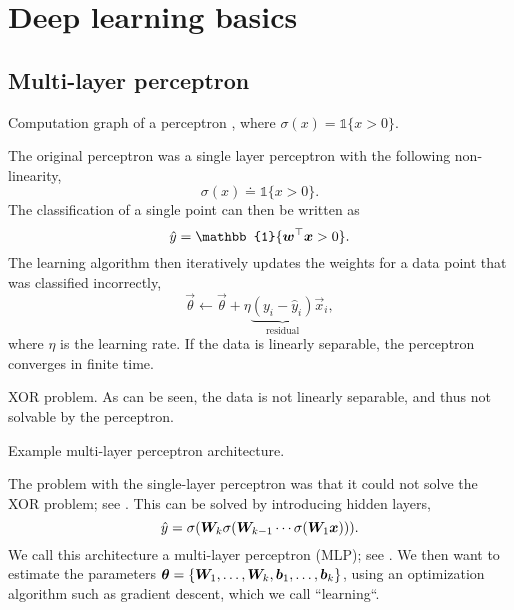 \section{Deep learning basics}

\subsection{Multi-layer perceptron}

\begin{marginfigure}
    \centering
    \caption{Computation graph of a perceptron \citep{rosenblatt1958perceptron}, where $\sigma(x) = \mathbb{1}\{ x > 0 \}$.}
    \label{fig:perceptron}
\end{marginfigure}

The original perceptron \citep{rosenblatt1958perceptron} was a single layer perceptron with the
following non-linearity, \[
    \sigma(x) \doteq \mathbb{1}\{ x > 0 \}.
\]
The classification of a single point can then be written as \[
    \hat{y} = \mathbb{1}\{\transpose{\vec{w}}\vec{x} > 0\}.
\]
The learning algorithm then iteratively updates the weights for a data point that was classified
incorrectly, \[
    \vec{\theta} \gets \vec{\theta} + \eta \underbrace{(y_i - \hat{y}_i)}_{\text{residual}} \vec{x}_i,
\]
where $\eta$ is the learning rate. If the data is linearly separable, the perceptron converges in
finite time.

\begin{marginfigure}
    \centering
    \caption{XOR problem. As can be seen, the data is not linearly separable, and thus not solvable by the perceptron.}
    \label{fig:xor-problem}
\end{marginfigure}

\begin{marginfigure}
    \centering
    \caption{Example multi-layer perceptron architecture.}
    \label{fig:mlp}
\end{marginfigure}

The problem with the single-layer perceptron was that it could not solve the XOR problem; see
. This can be solved by introducing hidden layers, \[
    \hat{y} = \sigma(\bm{W}_k \sigma(\bm{W}_{k-1} \cdots \sigma(\bm{W}_1 \bm{x}))).
\]
We call this architecture a multi-layer perceptron (MLP); see . We then want to
estimate the parameters $\bm{\theta} = \{ \bm{W}_1,\ldots,\bm{W}_k,\bm{b}_1,\ldots,\bm{b}_k
    \}$, using an optimization algorithm such as gradient descent, which we call ``learning``.

